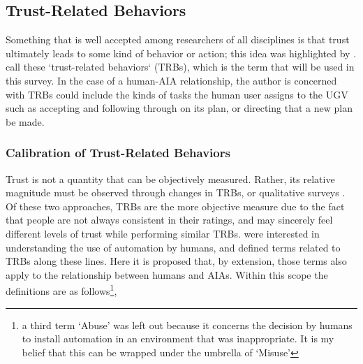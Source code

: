 \subsection{Trust-Related Behaviors} \label{sec:trbs}
Something that is well accepted among researchers of all disciplines is that trust ultimately leads to some kind of behavior or action; this idea was highlighted by \citet{Lewis1985-pr}.  \citet{McKnight2001-fa} call these `trust-related behaviors` (TRBs), which is the term that will be used in this survey. In the case of a human-AIA relationship, the author is concerned with TRBs could include the kinds of tasks the human user assigns to the UGV such as accepting and following through on its plan, or directing that a new plan be made.

\subsubsection{Calibration of Trust-Related Behaviors}
    Trust is not a quantity that can be objectively measured. Rather, its relative magnitude must be observed through changes in TRBs, or qualitative surveys \cite{Muir1996-gt}. Of these two approaches, TRBs are the more objective measure due to the fact that people are not always consistent in their ratings, and may sincerely feel different levels of trust while performing similar TRBs. \citet{Parasuraman1997-co} were interested in understanding the use of automation by humans, and defined terms related to TRBs along these lines. Here it is proposed that, by extension, those terms also apply to the relationship between humans and AIAs. Within this scope the definitions are as follows\footnote{a third term `Abuse' was left out because it concerns the decision by humans to install automation in an environment that was inappropriate. It is my belief that this can be wrapped under the umbrella of `Misuse'},
    
